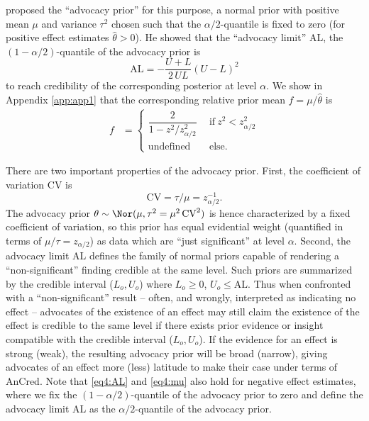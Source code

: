 \citet{Matthews2018} proposed the ``advocacy prior'' for this purpose, a normal
prior with positive mean $\mu$ and variance $\tau^2$ chosen such that the
$\alpha/2$-quantile is fixed to zero (for positive effect estimates
$\hat \theta > 0$). He showed that the ``advocacy limit'' AL, the
$(1-\alpha/2)$-quantile of the advocacy prior is
\begin{equation}\label{eq4:AL}
  \mbox{AL} = - \frac{U+L}{2 \, U L} (U-L)^2
\end{equation}
to reach credibility of the corresponding posterior at level $\alpha$. We show
in Appendix \ref{app:app1} that the corresponding relative prior mean
$f = \mu / \hat \theta$ is
\begin{align}
\label{eq4:mu}
  f &=
  \begin{cases}
    \dfrac{2}{1 - z^2/z_{\alpha/2}^2}
    & ~~ \text{if} ~
    {z^2} < {z_{\alpha/2}^2} \\
    \text{undefined} & ~~ \text{else. }
\end{cases}
\end{align}

There are two important properties of the advocacy prior. First, the coefficient
of variation CV is
$$\mbox{CV} = \tau/\mu = z_{\alpha/2}^{-1}.$$
The advocacy prior $\theta \sim \Nor(\mu, \tau^2=\mu^2 \, \mbox{CV}^2)$ is hence
characterized by a fixed coefficient of variation, so this prior has equal
evidential weight (quantified in terms of $\mu/\tau=z_{\alpha/2}$) as data which
are ``just significant'' at level $\alpha$. Second, the advocacy limit AL
defines the family of normal priors capable of rendering a ``non-significant''
finding credible at the same level. Such priors are summarized by the credible
interval ($L_o, U_o$) where $L_o \geq 0$, $U_o \leq \mbox{AL}$. Thus when
confronted with a ``non-significant'' result -- often, and wrongly, interpreted
as indicating no effect -- advocates of the existence of an effect may still
claim the existence of the effect is credible to the same level if there exists
prior evidence or insight compatible with the credible interval ($L_o, U_o$). If
the evidence for an effect is strong (weak), the resulting advocacy prior will
be broad (narrow), giving advocates of an effect more (less) latitude to make
their case under terms of AnCred. Note that \eqref{eq4:AL} and \eqref{eq4:mu}
also hold for negative effect estimates, where we fix the
$(1-\alpha/2)$-quantile of the advocacy prior to zero and define the advocacy
limit AL as the $\alpha/2$-quantile of the advocacy prior.

